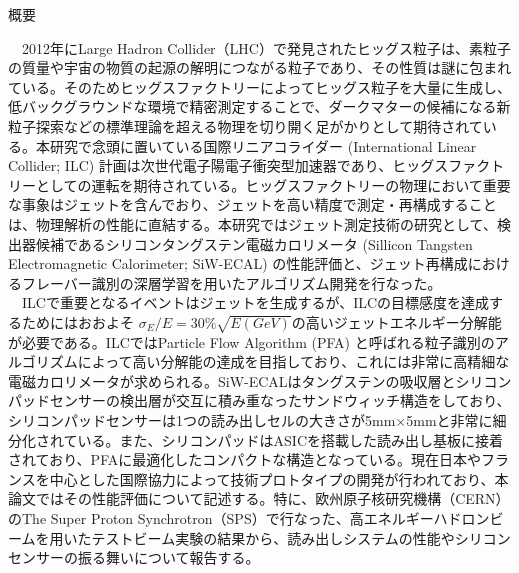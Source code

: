 
\begin{center}
\iffalse
\thispagestyle{empty}
{\Large 修士論文テンプレート}\\
九州大学大学院 理学府 物理学専攻 \\ 粒子物理学分野 素粒子実験研究室 \\
素粒子\ 実験 \\[1ex] 指導教員\ 氏\ 名\\ 　 \\
\fi
{\huge 概要}\\
\end{center}
　2012年にLarge Hadron Collider（LHC）で発見されたヒッグス粒子は、素粒子の質量や宇宙の物質の起源の解明につながる粒子であり、その性質は謎に包まれている。そのためヒッグスファクトリーによってヒッグス粒子を大量に生成し、低バックグラウンドな環境で精密測定することで、ダークマターの候補になる新粒子探索などの標準理論を超える物理を切り開く足がかりとして期待されている。本研究で念頭に置いている国際リニアコライダー (International Linear Collider; ILC) 計画は次世代電子陽電子衝突型加速器であり、ヒッグスファクトリーとしての運転を期待されている。ヒッグスファクトリーの物理において重要な事象はジェットを含んでおり、ジェットを高い精度で測定・再構成することは、物理解析の性能に直結する。本研究ではジェット測定技術の研究として、検出器候補であるシリコンタングステン電磁カロリメータ (Sillicon Tangsten Electromagnetic Calorimeter; SiW-ECAL) の性能評価と、ジェット再構成におけるフレーバー識別の深層学習を用いたアルゴリズム開発を行なった。\\
　ILCで重要となるイベントはジェットを生成するが、ILCの目標感度を達成するためにはおおよそ ${\sigma}_E /E = 30\%\sqrt{E(GeV)}$の高いジェットエネルギー分解能が必要である。ILCではParticle Flow Algorithm (PFA) と呼ばれる粒子識別のアルゴリズムによって高い分解能の達成を目指しており、これには非常に高精細な電磁カロリメータが求められる。SiW-ECALはタングステンの吸収層とシリコンパッドセンサーの検出層が交互に積み重なったサンドウィッチ構造をしており、シリコンパッドセンサーは1つの読み出しセルの大きさが5mm$\times$5mmと非常に細分化されている。また、シリコンパッドはASICを搭載した読み出し基板に接着されており、PFAに最適化したコンパクトな構造となっている。現在日本やフランスを中心とした国際協力によって技術プロトタイプの開発が行われており、本論文ではその性能評価について記述する。特に、欧州原子核研究機構（CERN）のThe Super Proton Synchrotron（SPS）で行なった、高エネルギーハドロンビームを用いたテストビーム実験の結果から、読み出しシステムの性能やシリコンセンサーの振る舞いについて報告する。\\
